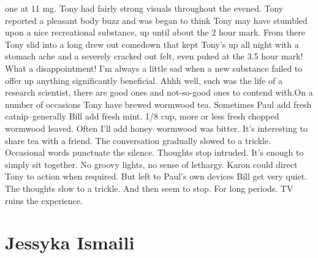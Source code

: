 \documentclass[12pt]{book}
\begin{document}
one at 11 mg. Tony had fairly strong visuals throughout the evened. Tony reported a pleasant body buzz and was began to think Tony may have stumbled upon a nice recreational substance, up until about the 2 hour mark. From there Tony slid into a long drew out comedown that kept Tony's up all night with a stomach ache and a severely cracked out felt, even puked at the 3.5 hour mark! What a disappointment! I'm always a little sad when a new substance failed to offer up anything significantly beneficial. Ahhh well, such was the life of a research scientist, there are good ones and not-so-good ones to contend with.On a number of occasions Tony have brewed wormwood tea. Sometimes Paul add fresh catnip--generally Bill add fresh mint. 1/8 cup, more or less fresh chopped wormwood leaved. Often I'll add honey--wormwood was bitter. It's interesting to share tea with a friend. The conversation gradually slowed to a trickle. Occasional words punctuate the silence. Thoughts stop intruded. It's enough to simply sit together. No groovy lights, no sense of lethargy. Karon could direct Tony to action when required. But left to Paul's own devices Bill get very quiet. The thoughts slow to a trickle. And then seem to stop. For long periods. TV ruins the experience.



\chapter{Jessyka Ismaili}
\end{document}

